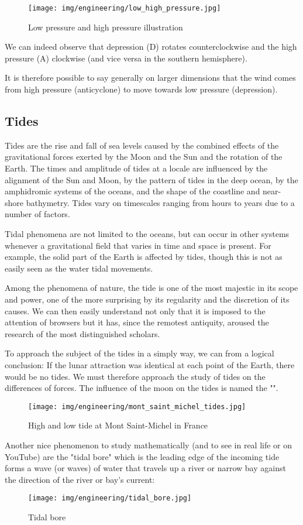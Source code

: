 	\begin{figure}[H]
		\centering
		\texttt{[image: img/engineering/low\_high\_pressure.jpg]}	
		\caption{Low pressure and high pressure illustration}
	\end{figure}
	We can indeed observe that depression (D) rotates counterclockwise and the high pressure (A) clockwise (and vice versa in the southern hemisphere).
	\begin{tcolorbox}[title=Remark,colframe=black,arc=10pt]
	It is therefore possible to say generally on larger dimensions that the wind comes from high pressure (anticyclone) to move towards low pressure (depression).
	\end{tcolorbox}
	
	\pagebreak
	\subsection{Tides}
	Tides are the rise and fall of sea levels caused by the combined effects of the gravitational forces exerted by the Moon and the Sun and the rotation of the Earth. The times and amplitude of tides at a locale are influenced by the alignment of the Sun and Moon, by the pattern of tides in the deep ocean, by the amphidromic systems of the oceans, and the shape of the coastline and near-shore bathymetry. Tides vary on timescales ranging from hours to years due to a number of factors.

	Tidal phenomena are not limited to the oceans, but can occur in other systems whenever a gravitational field that varies in time and space is present. For example, the solid part of the Earth is affected by tides, though this is not as easily seen as the water tidal movements.
	
	Among the phenomena of nature, the tide is one of the most majestic in its scope and power, one of the more surprising by its regularity and the discretion of its causes. We can then easily understand not only that it is imposed to the attention of browsers but it has, since the remotest antiquity, aroused the research of the most distinguished scholars.

	To approach the subject of the tides in a simply way, we can from a logical conclusion: If the lunar attraction was identical at each point of the Earth, there would be no tides. We must therefore approach the study of tides on the differences of forces. The influence of the moon on the tides is named the "".
	\begin{figure}[H]
		\centering
		\texttt{[image: img/engineering/mont\_saint\_michel\_tides.jpg]}
		\caption{High and low tide at Mont Saint-Michel in France}
	\end{figure}
	Another nice phenomenon to study mathematically (and to see in real life or on YouTube) are the "tidal bore" which is the leading edge of the incoming tide forms a wave (or waves) of water that travels up a river or narrow bay against the direction of the river or bay's current:
	\begin{figure}[H]
		\centering
		\texttt{[image: img/engineering/tidal\_bore.jpg]}
		\caption{Tidal bore}
	\end{figure}
	
